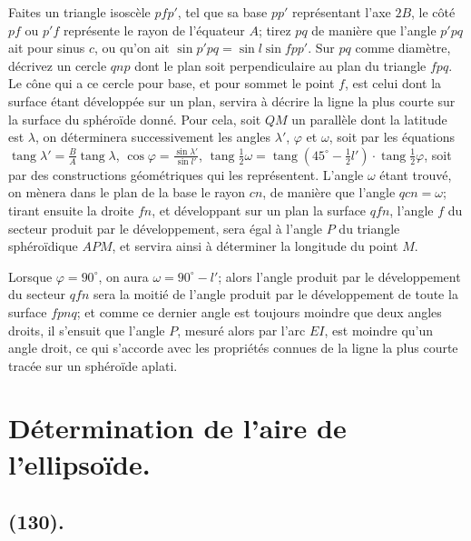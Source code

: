 \documentclass{article}
\begin{document}

Faites un triangle isoscèle $pfp'$, tel que sa base $pp'$ représentant l'axe $2B$, le côté $pf$ ou $p'f$ représente le rayon de l'équateur $A$; tirez $pq$ de manière que l'angle $p'pq$ ait pour sinus $c$, ou qu'on ait $\sin p'pq=\sin l\sin fpp'$. Sur $pq$ comme diamètre, décrivez un cercle $qnp$ dont le plan soit perpendiculaire au plan du triangle $fpq$. Le cône qui a ce cercle pour base, et pour sommet le point $f$, est celui dont la surface étant développée sur un plan, servira à décrire la ligne la plus courte sur la surface du sphéroïde donné. Pour cela, soit $QM$ un parallèle dont la latitude est $\lambda$, on déterminera successivement les angles $\lambda'$, $\varphi$ et $\omega$, soit par les équations $\operatorname{tang}\lambda'=\frac{B}{A}\operatorname{tang}\lambda$, $\cos\varphi=\frac{\sin\lambda'}{\sin l'}$, $\operatorname{tang}\frac{1}{2}\omega=\operatorname{tang}(45^{\circ}-\frac{1}{2}l')\cdot\operatorname{tang}\frac{1}{2}\varphi$, soit par des constructions géométriques qui les représentent. L'angle $\omega$ étant trouvé, on mènera dans le plan de la base le rayon $cn$, de manière que l'angle $qcn=\omega$; tirant ensuite la droite $fn$, et développant sur un plan la surface $qfn$, l'angle $f$ du secteur produit par le développement, sera égal à l'angle $P$ du triangle sphéroïdique $APM$, et servira ainsi à déterminer la longitude du point $M$.

Lorsque $\varphi=90^{\circ}$, on aura $\omega=90^{\circ}-l'$; alors l'angle produit par le développement du secteur $qfn$ sera la moitié de l'angle produit par le développement de toute la surface $fpnq$; et comme ce dernier angle est toujours moindre que deux angles droits, il s'ensuit que l'angle $P$, mesuré alors par l'arc $EI$, est moindre qu'un angle droit, ce qui s'accorde avec les propriétés connues de la ligne la plus courte tracée sur un sphéroïde aplati.

\section*{Détermination de l'aire de l'ellipsoïde.}

\subsection*{(130).}
\end{document}
